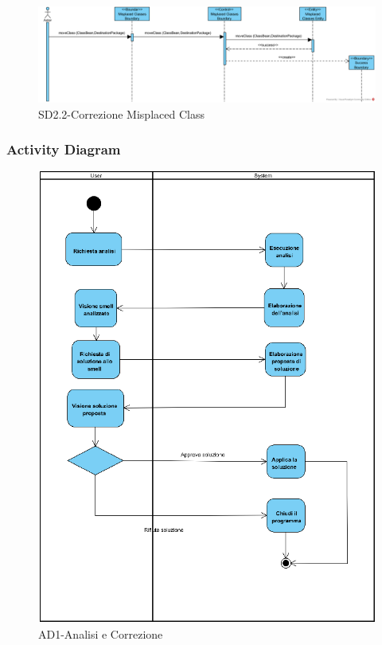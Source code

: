 \documentclass[11pt]{article}
\begin{document}
				\begin{figure}[h!]
					\includegraphics[width=\columnwidth]{SD_Misplaced_Classes.png}
					\caption{SD2.2-Correzione Misplaced Class}
				\end{figure}
			\newpage
			\subsubsection{Activity Diagram}
				\begin{figure}[h!]
					\centering
					\includegraphics[scale=2]{ActivityDiagramCurrent.png}
					\caption{AD1-Analisi e Correzione}
				\end{figure}
		
\end{document}
